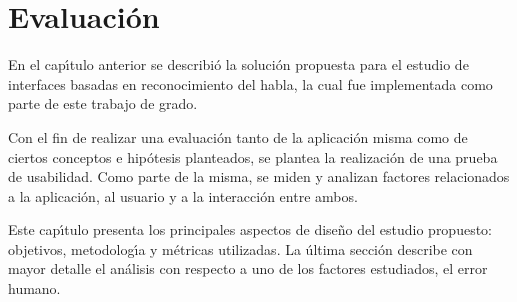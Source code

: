 \chapter{Evaluaci\'on}
\label{sec:evaluacion}


En el cap{\'\i}tulo anterior se describi\'o la soluci\'on propuesta para el estudio de interfaces basadas en
reconocimiento del habla, la cual fue implementada como parte de este trabajo de grado.

Con el fin de realizar una evaluaci\'on tanto de la aplicaci\'on misma como de ciertos conceptos 
e hip\'otesis planteados, se plantea la realización de una prueba de usabilidad. 
Como parte de la misma, se miden y analizan factores relacionados a la aplicaci\'on,
al usuario y a la interacci\'on entre ambos.

Este cap{\'\i}tulo presenta los principales aspectos de dise\~no del estudio propuesto: objetivos, metodolog{\'\i}a
y m\'etricas utilizadas. La \'ultima secci\'on describe con mayor detalle el an\'alisis con respecto
a uno de los factores estudiados, el error humano.





